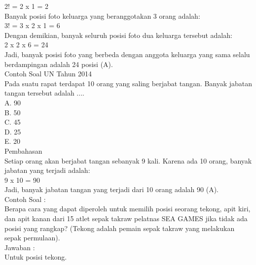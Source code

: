 \documentclass[11pt,fleqn]{book} %
\begin{document}
2! = 2 x 1 = 2\\

Banyak posisi foto keluarga yang beranggotakan 3 orang adalah:\\

3! = 3 x 2 x 1 = 6\\

Dengan demikian, banyak seluruh posisi foto dua keluarga tersebut adalah:\\

2 x 2 x 6 = 24\\

Jadi, banyak posisi foto yang berbeda dengan anggota keluarga yang sama selalu berdampingan adalah 24 posisi (A). \\

Contoh Soal UN Tahun 2014 \\
Pada suatu rapat terdapat 10 orang yang saling berjabat tangan. Banyak jabatan tangan tersebut adalah ....\\

A.   90\\

B.   50\\

C.   45\\

D.   25\\

E.   20\\


Pembahasan\\
Setiap orang akan berjabat tangan sebanyak 9 kali. Karena ada 10 orang, banyak jabatan yang terjadi adalah:\\

9 x 10 = 90\\

Jadi, banyak jabatan tangan yang terjadi dari 10 orang  adalah 90 (A).\\


Contoh Soal :\\

Berapa cara yang dapat diperoleh untuk memilih posisi seorang tekong, apit kiri, dan apit kanan dari 15 atlet sepak takraw pelatnas SEA GAMES jika tidak ada posisi yang rangkap? (Tekong adalah pemain sepak takraw yang melakukan sepak permulaan).\\

Jawaban :\\

Untuk posisi tekong.\\
\end{document}
